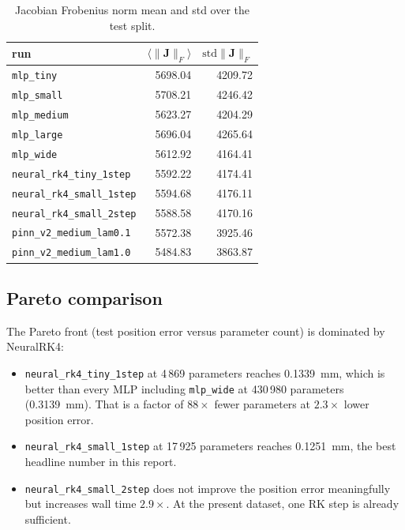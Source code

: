 \documentclass[a4paper,11pt]{article}
\newcommand{\SI}[2]{#1~#2}
\newcommand{\Jac}{\mathbf{J}}
\begin{document}
\begin{table}[htbp]
\centering\small
\caption{Jacobian Frobenius norm mean and std over the test split.}
\label{gen2new:tab:jacobian}
\begin{tabular}{lrr}
\toprule
run & $\langle\|\Jac\|_F\rangle$ & $\mathrm{std}\|\Jac\|_F$ \\
\midrule
\texttt{mlp\_tiny}                     & 5698.04 & 4209.72 \\
\texttt{mlp\_small}                    & 5708.21 & 4246.42 \\
\texttt{mlp\_medium}                   & 5623.27 & 4204.29 \\
\texttt{mlp\_large}                    & 5696.04 & 4265.64 \\
\texttt{mlp\_wide}                     & 5612.92 & 4164.41 \\
\texttt{neural\_rk4\_tiny\_1step}      & 5592.22 & 4174.41 \\
\texttt{neural\_rk4\_small\_1step}     & 5594.68 & 4176.11 \\
\texttt{neural\_rk4\_small\_2step}     & 5588.58 & 4170.16 \\
\texttt{pinn\_v2\_medium\_lam0.1}      & 5572.38 & 3925.46 \\
\texttt{pinn\_v2\_medium\_lam1.0}      & 5484.83 & 3863.87 \\
\bottomrule
\end{tabular}
\end{table}

\subsection{Pareto comparison}

The Pareto front (test position error versus parameter count) is
dominated by NeuralRK4:
\begin{itemize}
\item \texttt{neural\_rk4\_tiny\_1step} at 4\,869 parameters reaches
  \SI{0.1339}{mm}, which is better than every MLP including
  \texttt{mlp\_wide} at 430\,980 parameters (\SI{0.3139}{mm}). That
  is a factor of $88\times$ fewer parameters at $2.3\times$ lower
  position error.
\item \texttt{neural\_rk4\_small\_1step} at 17\,925 parameters
  reaches \SI{0.1251}{mm}, the best headline number in this report.
\item \texttt{neural\_rk4\_small\_2step} does not improve the
  position error meaningfully but increases wall time $2.9\times$.
  At the present dataset, one RK step is already sufficient.
\end{itemize}
\end{document}
